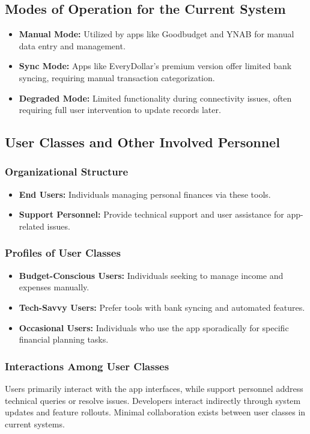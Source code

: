\subsection{Modes of Operation for the Current System}
\begin{itemize}
    \item \textbf{Manual Mode:} Utilized by apps like Goodbudget and YNAB for manual data entry and management.
    \item \textbf{Sync Mode:} Apps like EveryDollar’s premium version offer limited bank syncing, requiring manual transaction categorization.
    \item \textbf{Degraded Mode:} Limited functionality during connectivity issues, often requiring full user intervention to update records later.
\end{itemize}

\subsection{User Classes and Other Involved Personnel}

\subsubsection{Organizational Structure}
\begin{itemize}
    \item \textbf{End Users:} Individuals managing personal finances via these tools.
    \item \textbf{Support Personnel:} Provide technical support and user assistance for app-related issues.
\end{itemize}

\subsubsection{Profiles of User Classes}
\begin{itemize}
    \item \textbf{Budget-Conscious Users:} Individuals seeking to manage income and expenses manually.
    \item \textbf{Tech-Savvy Users:} Prefer tools with bank syncing and automated features.
    \item \textbf{Occasional Users:} Individuals who use the app sporadically for specific financial planning tasks.
\end{itemize}

\subsubsection{Interactions Among User Classes}
Users primarily interact with the app interfaces, while support personnel address technical queries or resolve issues. Developers interact indirectly through system updates and feature rollouts. Minimal collaboration exists between user classes in current systems.

